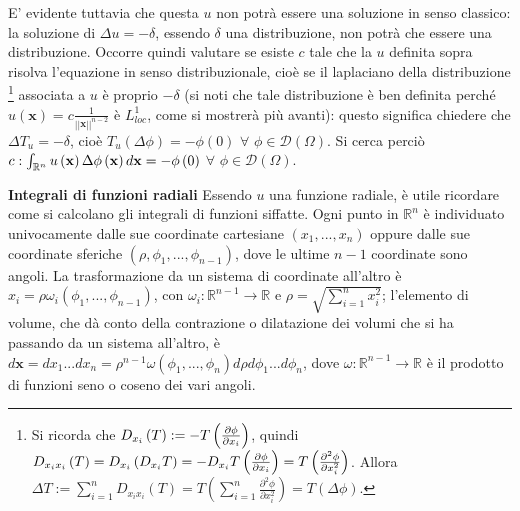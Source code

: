 \documentclass{article}
\begin{document}
E' evidente tuttavia che questa $u$ non potr\`{a} essere una soluzione in
senso classico: la soluzione di $\Delta u=-\delta $, essendo $\delta $ una
distribuzione, non potr\`{a} che essere una distribuzione. Occorre quindi
valutare se esiste $c$ tale che la $u$ definita sopra risolva l'equazione in
senso distribuzionale, cio\`{e} se il laplaciano della distribuzione%
\footnote{%
Si ricorda che $D_{x_{i}}\left( T\right) :=-T\left( \frac{\partial \phi }{%
\partial x_{i}}\right) $, quindi $D_{x_{i}x_{i}}\left( T\right)
=D_{x_{i}}\left( D_{x_{i}}T\right) =-D_{x_{i}}T\left( \frac{\partial \phi }{%
\partial x_{i}}\right) =T\left( \frac{\partial ^{2}\phi }{\partial x_{i}^{2}}%
\right) $. Allora $\Delta T:=\sum_{i=1}^{n}D_{x_{i}x_{i}}\left( T\right)
=T\left( \sum_{i=1}^{n}\frac{\partial ^{2}\phi }{\partial x_{i}^{2}}\right)
=T\left( \Delta \phi \right) $.} associata a $u$ \`{e} proprio $-\delta $
(si noti che tale distribuzione \`{e} ben definita perch\'{e} $u\left( 
\mathbf{x}\right) =c\frac{1}{\left\vert \left\vert \mathbf{x}\right\vert
\right\vert ^{n-2}}$ \`{e} $L_{loc}^{1}$, come si mostrer\`{a} pi\`{u}
avanti): questo significa chiedere che $\Delta T_{u}=-\delta $, cio\`{e} $%
T_{u}\left( \Delta \phi \right) =-\phi \left( 0\right) $ $\forall $ $\phi
\in \mathcal{D}\left( \Omega \right) $. Si cerca perci\`{o} $c:\int_{%
\mathbb{R}
^{n}}u\left( \mathbf{x}\right) \Delta \phi \left( \mathbf{x}\right) d\mathbf{%
x}=-\phi \left( 0\right) $ $\forall $ $\phi \in \mathcal{D}\left( \Omega
\right) $.

\textbf{Integrali di funzioni radiali} Essendo $u$ una funzione radiale, 
\`{e} utile ricordare come si calcolano gli integrali di funzioni siffatte.
Ogni punto in $%
\mathbb{R}
^{n}$ \`{e} individuato univocamente dalle sue coordinate cartesiane $\left(
x_{1},...,x_{n}\right) $ oppure dalle sue coordinate sferiche $\left( \rho
,\phi _{1},...,\phi _{n-1}\right) $, dove le ultime $n-1$ coordinate sono
angoli. La trasformazione da un sistema di coordinate all'altro \`{e} $%
x_{i}=\rho \omega _{i}\left( \phi _{1},...,\phi _{n-1}\right) $, con $\omega
_{i}:%
\mathbb{R}
^{n-1}\rightarrow 
\mathbb{R}
$ e $\rho =\sqrt{\sum_{i=1}^{n}x_{i}^{2}}$; l'elemento di volume, che d\`{a}
conto della contrazione o dilatazione dei volumi che si ha passando da un
sistema all'altro, \`{e} $d\mathbf{x}=dx_{1}...dx_{n}=\rho ^{n-1}\omega
\left( \phi _{1},...,\phi _{n}\right) d\rho d\phi _{1}...d\phi _{n}$, dove $%
\omega :%
\mathbb{R}
^{n-1}\rightarrow 
\mathbb{R}
$ \`{e} il prodotto di funzioni seno o coseno dei vari angoli.
\end{document}
